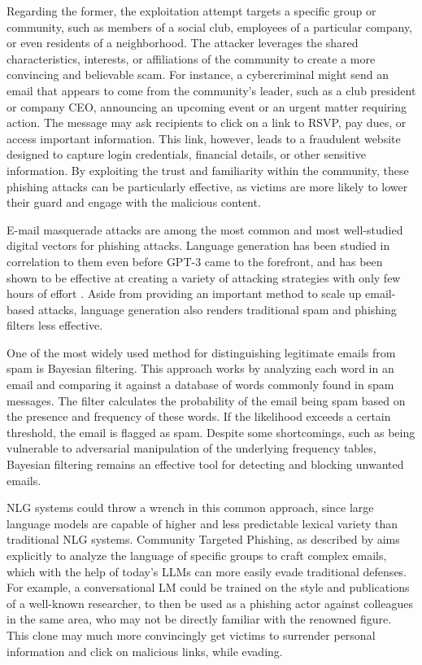Regarding the former, the exploitation attempt targets a specific group or community, such as members of a social club, employees of a particular company, or even residents of a neighborhood. The attacker leverages the shared characteristics, interests, or affiliations of the community to create a more convincing and believable scam.
For instance, a cybercriminal might send an email that appears to come from the community’s leader, such as a club president or company CEO, announcing an upcoming event or an urgent matter requiring action.
The message may ask recipients to click on a link to RSVP, pay dues, or access important information.
This link, however, leads to a fraudulent website designed to capture login credentials, financial details, or other sensitive information.
By exploiting the trust and familiarity within the community, these phishing attacks can be particularly effective, as victims are more likely to lower their guard and engage with the malicious content.

E-mail masquerade attacks are among the most common and most well-studied \citep{Khonji2013PhishingDA} digital vectors for phishing attacks.
Language generation has been studied in correlation to them even before GPT-3 came to the forefront, and has been shown to be effective at creating a variety of attacking strategies with only few hours of effort \citep{bakie2017scaling}.
Aside from providing an important method to scale up email-based attacks, language generation also renders traditional spam and phishing filters less effective.

One of the most widely used method for distinguishing legitimate emails from spam is Bayesian filtering. This approach works by analyzing each word in an email and comparing it against a database of words commonly found in spam messages.
The filter calculates the probability of the email being spam based on the presence and frequency of these words. If the likelihood exceeds a certain threshold, the email is flagged as spam.
Despite some shortcomings, such as being vulnerable to adversarial manipulation of the underlying frequency tables, Bayesian filtering remains an effective tool for detecting and blocking unwanted emails.

NLG systems could throw a wrench in this common approach, since large language models are capable of higher and less predictable lexical variety than traditional NLG systems.
Community Targeted Phishing, as described by \citet{Giaretta_2019} aims explicitly to analyze the language of specific groups to craft complex emails, which with the help of today's LLMs can more easily evade traditional defenses.
For example, a conversational LM could be trained on the style and publications of a well-known researcher, to then be used as a phishing actor against colleagues in the same area, who may not be directly familiar with the renowned figure.
This clone may much more convincingly get victims to surrender personal information and click on malicious links, while evading.

